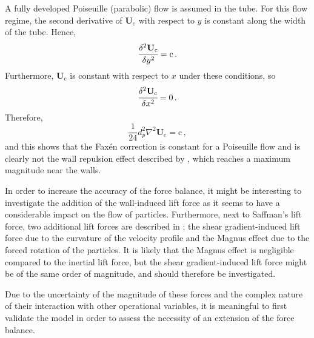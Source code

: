 A fully developed Poiseuille (parabolic) flow is assumed in the tube. For this flow regime, the second derivative of $\mathbf{U}_\mathrm{c}$ with respect to $y$ is constant along the width of the tube. Hence,
\begin{equation}
 \cfrac{\delta^2 \mathbf{U}_\mathrm{c}}{\delta y^2} = \mathrm{c} \, .
\end{equation}
Furthermore, $\mathbf{U}_\mathrm{c}$ is constant with respect to $x$ under these conditions, so
\begin{equation}
 \cfrac{\delta^2 \mathbf{U}_\mathrm{c}}{\delta x^2} = 0 \, .
\end{equation}
Therefore,
\begin{equation}
\frac{1}{24}d_p^2 \nabla^2 \mathbf{U}_\mathrm{c} = \mathrm{c} \, ,
\end{equation}
and this shows that the Fax\'en correction is constant for a Poiseuille flow and is clearly not the wall repulsion effect described by \cite{Zeng2005}, which reaches a maximum magnitude near the walls. \par
In order to increase the accuracy of the force balance, it might be interesting to investigate the addition of the wall-induced lift force as it seems to have a considerable impact on the flow of particles. Furthermore, next to Saffman's lift force, two additional lift forces are described in \cite{Matas2004}; the shear gradient-induced lift force due to the curvature of the velocity profile and the Magnus effect due to the forced rotation of the particles. It is likely that the Magnus effect is negligible compared to the inertial lift force, but the shear gradient-induced lift force might be of the same order of magnitude, and should therefore be investigated. \par
Due to the uncertainty of the magnitude of these forces and the complex nature of their interaction with other operational variables, it is meaningful to first validate the model in order to assess the necessity of an extension of the force balance.


